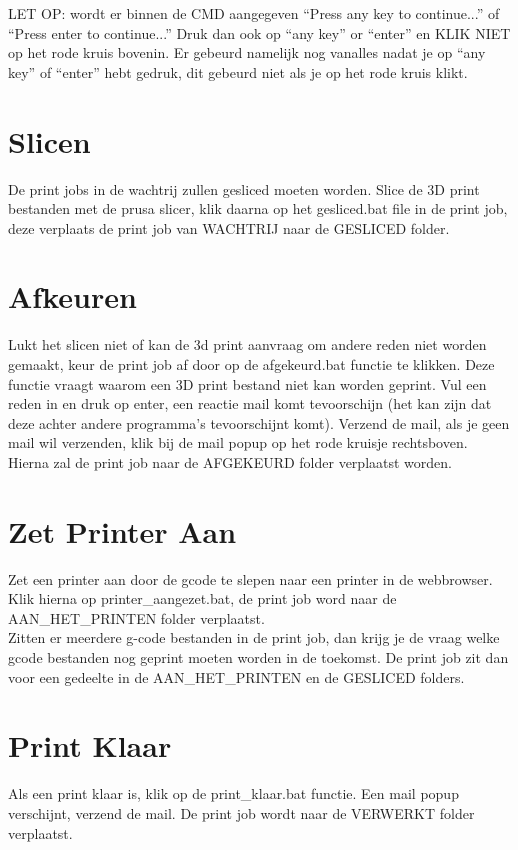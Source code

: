 \documentclass{article}
\newcommand{\quotes}[1]{``#1''}
\begin{document}
LET OP: wordt er binnen de CMD aangegeven \quotes{Press any key to continue...} of \quotes{Press enter to continue...} Druk dan ook op \quotes{any key} or \quotes{enter} en KLIK NIET op het rode kruis bovenin. Er gebeurd namelijk nog vanalles nadat je op \quotes{any key} of \quotes{enter} hebt gedruk, dit gebeurd niet als je op het rode kruis klikt.\\

\section*{Slicen}
De print jobs in de wachtrij zullen gesliced moeten worden. Slice de 3D print bestanden met de prusa slicer, klik daarna op het gesliced.bat file in de print job, deze verplaats de print job van WACHTRIJ naar de GESLICED folder. 

\section*{Afkeuren}
Lukt het slicen niet of kan de 3d print aanvraag om andere reden niet worden gemaakt, keur de print job af door op de afgekeurd.bat functie te klikken. Deze functie vraagt waarom een 3D print bestand niet kan worden geprint. Vul een reden in en druk op enter, een reactie mail komt tevoorschijn (het kan zijn dat deze achter andere programma's tevoorschijnt komt). Verzend de mail, als je geen mail wil verzenden, klik bij de mail popup op het rode kruisje rechtsboven. Hierna zal de print job naar de AFGEKEURD folder verplaatst worden.

\section*{Zet Printer Aan}
Zet een printer aan door de gcode te slepen naar een printer in de webbrowser. Klik hierna op printer\_aangezet.bat, de print job word naar de AAN\_HET\_PRINTEN folder verplaatst.\\

Zitten er meerdere g-code bestanden in de print job, dan krijg je de vraag welke gcode bestanden nog geprint moeten worden in de toekomst. De print job zit dan voor een gedeelte in de AAN\_HET\_PRINTEN en de GESLICED folders. 

\section*{Print Klaar}
Als een print klaar is, klik op de print\_klaar.bat functie. Een mail popup verschijnt, verzend de mail. De print job wordt naar de VERWERKT folder verplaatst. 
\end{document}
